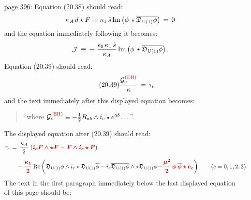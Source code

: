 \documentclass[12pt]{GeomPhysBOOK}
\newcommand\correct[1]{{\color{red!80!black}\bf #1}}
\newcommand\mcorrect[1]{{\color{red!80!black}\bm{#1}}}
\newcommand\listrule{\vspace{0.2cm}\hrule height 0.3pt}
\begin{document}
\begin{enumerate}[leftmargin=1.9cm,labelwidth=1.4cm,itemsep=0.5cm]
\begin{align*}
				&\hspace{1cm} - \varye{c} \w \text{Re}\left( \mcorrect{\GLD_{\text{U}(1)}}\phi \w i_{c}\star\overline{\GLD_{\text{U}(1)}\phi} - i_{c}\overline{\GLD_{\text{U}(1)}\phi} \w \star \GLD_{\text{U}(1)}\phi\right). 
		\end{align*}
		The displayed equation immediately above equation (20.37) should read:
		\begin{align*}
			\whh{\delta}\left(\df \correct{\ACTION{EH}}[e,\omega] \;\correct{+}\; \ACTION{SOURCE}[e,A,\phi,\phibar]\right) \,\simeq\, 0,
		\end{align*}
	\listrule
	\newpage
	\listrule
	\item[\underline{page 396}:]
		Equation (20.38) should read:
		\begin{align}\label{MAX1_15_01_24}
			\kappa_{A}\,d\star F \;\mcorrect{+}\; \kappa_{1}\,\hat{s}\,\text{Im}\left(\phi \, \star \overline{\GLD_{\text{U}(1)}\phi}\right) \,=\, 0
		\end{align}
		and the equation immediately following it becomes:
		\begin{align*}
			\mathcal{J} \,\equiv\, \mcorrect{-}\;\frac{\epsilon_{0}\,\kappa_{1}\,\hat{s}}{\kappa_{A}}\,\text{Im}\left(\phi \, \star \overline{\GLD_{\text{U}(1)}\phi}\right).
		\end{align*}
		Equation (20.39) should read:
		\begin{align}\tag{20.39}
			\frac{\EINFM{c}^{\correct{(\text{EH})}}}{\kappa} \,=\, \tau_{c}
		\end{align} 
		and the text immediately after this displayed equation becomes:
		\begin{quote}
			``where $\EINFM{c}^{\correct{(\text{EH})}}\equiv -\frac{1}{2}R_{ab} \w i_{c}\star e^{ab} \ldots$''.
		\end{quote}
		The displayed equation after (20.39) should read:
		\begin{align*}
			\tau_{c} &\,=\, \frac{\kappa_{A}}{2}\,\left(\mcorrect{i_{c}F \w \star F - F \w i_{c}\star F} \right) \\[0.2cm]
				&\hspace{0.4cm} - \mcorrect{\frac{\kappa_{1}}{2}}\,\text{Re}\left(\GLD_{\text{U}(1)}\phi \w i_{c}\star \GLD_{\text{U}(1)}\phibar - i_{c}\overline{\GLD_{\text{U}(1)}\phi} \w \star \GLD_{\text{U}(1)}\phi \mcorrect{ - \frac{\mu^{2}}{2}\,\phi\,\phibar \star e_{c}} \right) \qquad (c=0,1,2,3).
		\end{align*}
		The text in the first paragraph immediately below the last displayed equation of this page should be:

\end{enumerate}
\end{document}
